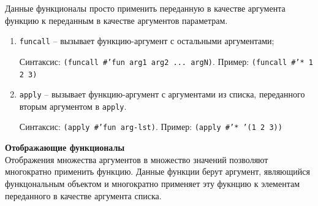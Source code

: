 \documentclass[12pt]{report}
\begin{document}
Данные функционалы просто применить переданную в качестве аргумента функцию к переданным в качестве аргументов параметрам.

\begin{enumerate}
	\item \texttt{funcall} -- вызывает функцию-аргумент с остальными аргументами;
	
	Синтаксис: \texttt{(funcall \#'fun arg1 arg2 ... argN)}.
	Пример: \texttt{(funcall \#'* 1 2 3)}
	
	\item \texttt{apply} -- вызывает функцию-аргумент с аргументами из списка, переданного вторым аргументом в \texttt{apply}.
	
	Синтаксис: \texttt{(apply \#'fun arg-lst)}.
	Пример: \texttt{(apply \#'* '(1 2 3))}
\end{enumerate}

\textbf{Отображающие функционалы}\\

Отображения множества аргументов в множество значений позволяют многократно применить функцию. Данные функции берут аргумент, являющийся функцональным объектом и многократно применяет эту фукнцию к элементам переданного в качестве аргумента списка.
\end{document}
